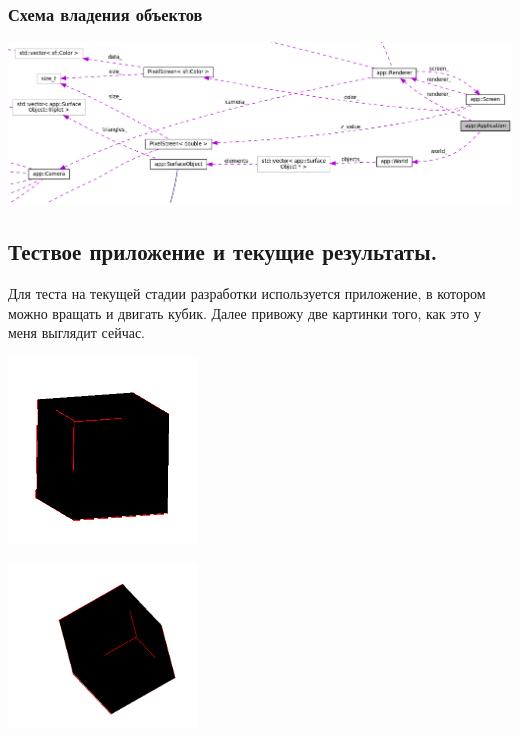 \documentclass{article}
\begin{document}
\subsubsection{Схема владения объектов}

\begin{center}
\includegraphics[width=15cm]{scheme_properties.png}
\end{center}

\newpage
\subsection{Тествое приложение и текущие результаты.}

Для теста на текущей стадии разработки используется приложение, в котором можно вращать и двигать кубик. Далее привожу две картинки того, как это у меня выглядит сейчас.

\begin{center}
\includegraphics[width=5cm]{cube-1.png}

\includegraphics[width=5cm]{cube-2.png}
\end{center}







\end{document}
